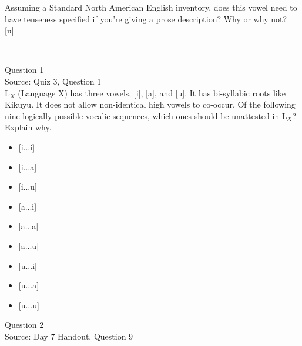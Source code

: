\documentclass[12pt]{article}
\begin{document}
Assuming a Standard North American English inventory, does this vowel need to have tenseness specified if you're giving a prose description? Why or why not?\\

{[u]}


\newpage

\begin{center}
\textbf{{\color{red}{\HUGE END OF EXAM}}}\\

\end{center}
\newpage

\begin{center}
\textbf{{\color{blue}{\HUGE START OF EXAM\\}}}

\textbf{{\color{blue}{\HUGE Student ID: 7661\\}}}

\textbf{{\color{blue}{\HUGE 12:15 PM - 12:30 PM\\}}}

\end{center}
\newpage

{\large Question 1}\\

Source: Quiz 3, Question 1\\

L$_X$ (Language X) has three vowels, [i], [a], and [u]. It has bi-syllabic roots like Kikuyu. It does not allow non-identical high vowels to co-occur. Of the following nine logically possible vocalic sequences, which ones should be unattested in L$_X$? Explain why.\\

\begin{itemize} \item {[i...i]} \item {[i...a]} \item {[i...u]} \item {[a...i]} \item {[a...a]} \item {[a...u]} \item {[u...i]} \item {[u...a]} \item {[u...u]} \end{itemize}


\newpage

{\large Question 2}\\

Source: Day 7 Handout, Question 9\\
\end{document}
